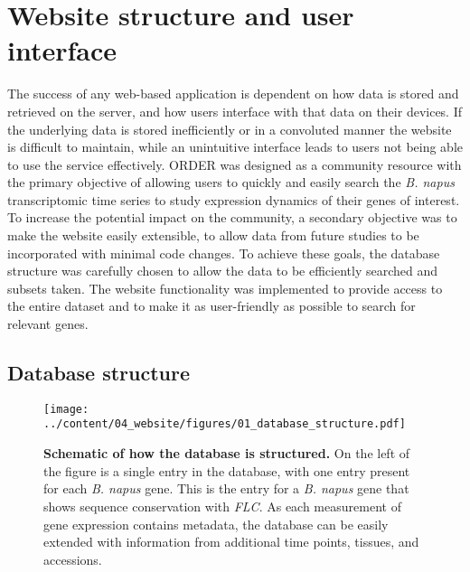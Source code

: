 \documentclass[12pt,]{book}
\begin{document}
\section{Website structure and user
interface}\label{website-structure-and-user-interface}

The success of any web-based application is dependent on how data is
stored and retrieved on the server, and how users interface with that
data on their devices. If the underlying data is stored inefficiently or
in a convoluted manner the website is difficult to maintain, while an
unintuitive interface leads to users not being able to use the service
effectively. ORDER was designed as a community resource with the primary
objective of allowing users to quickly and easily search the \emph{B.
napus} transcriptomic time series to study expression dynamics of their
genes of interest. To increase the potential impact on the community, a
secondary objective was to make the website easily extensible, to allow
data from future studies to be incorporated with minimal code changes.
To achieve these goals, the database structure was carefully chosen to
allow the data to be efficiently searched and subsets taken. The website
functionality was implemented to provide access to the entire dataset
and to make it as user-friendly as possible to search for relevant
genes.

\subsection{Database structure}\label{database-structure}

\begin{figure}[htbp]
\centering
\texttt{[image: ../content/04\_website/figures/01\_database\_structure.pdf]}
\caption{\textbf{Schematic of how the database is structured.} On the
left of the figure is a single entry in the database, with one entry
present for each \emph{B. napus} gene. This is the entry for a \emph{B.
napus} gene that shows sequence conservation with \emph{FLC}. As each
measurement of gene expression contains metadata, the database can be
easily extended with information from additional time points, tissues,
and accessions.}\label{figure:website:database}
\end{figure}
\end{document}
